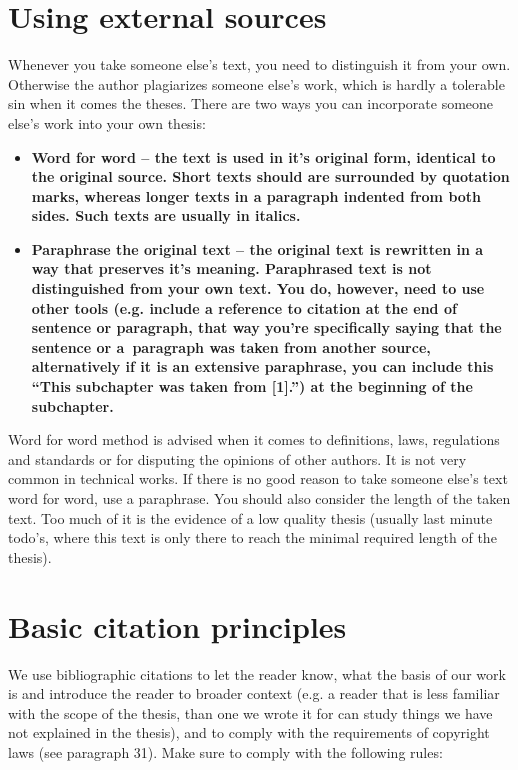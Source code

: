 {{\section{Using external sources}

Whenever you take someone else's text, you need to distinguish it from your own. Otherwise the author plagiarizes someone else's work, which is hardly a tolerable sin when it comes the theses. There are two ways you can incorporate someone else's work into your own thesis:

\begin{itemize}
  \item{\bf Word for word \rm -- the text is used in it's original form, identical to the original source. Short texts should are surrounded by quotation marks, whereas longer texts in a paragraph indented from both sides. Such texts are usually in italics.}
  \item{\bf Paraphrase the original text \rm -- the original text is rewritten in a way that preserves it's meaning. Paraphrased text is not distinguished from your own text. You do, however, need to use other tools (e.g. include a reference to citation at the end of sentence or paragraph, that way you're specifically saying that the sentence or a~paragraph was taken from another source, alternatively if it is an extensive paraphrase, you can include this ``This subchapter was taken from [1].'') at the beginning of the subchapter.}
\end{itemize}

Word for word method is advised when it comes to definitions, laws, regulations and standards or for disputing the opinions of other authors. It is not very common in technical works. If there is no good reason to take someone else's text word for word, use a paraphrase. You should also consider the length of the taken text. Too much of it is the evidence of a low quality thesis (usually last minute todo's, where this text is only there to reach the minimal required length of the thesis).

\section{Basic citation principles}

We use bibliographic citations to let the reader know, what the basis of our work is and introduce the reader to broader context (e.g. a reader that is less familiar with the scope of the thesis, than one we wrote it for can study things we have not explained in the thesis), and to comply with the requirements of copyright laws (see paragraph 31). Make sure to comply with the following rules:

}}
